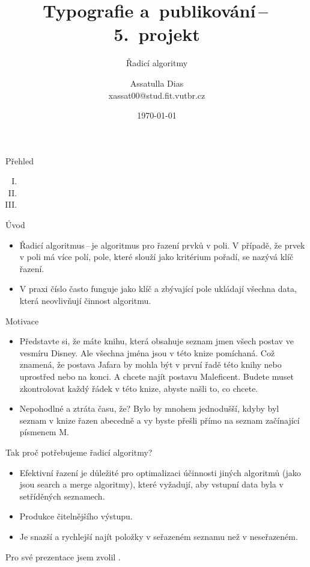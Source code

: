 \documentclass[11pt]{beamer}
\title{Typografie a~publikování\,--\,5.~projekt}
\subtitle{Řadicí algoritmy}
\author{Assatulla Dias \\\smallskip \tiny{xassat00@stud.fit.vutbr.cz}}
\date{\today}
\begin{document}
\maketitle
{}
\begin{frame}{Přehled}
 \begin{enumerate}[(I)]
     \item {}
     \pause
     \item {}
     \pause
     \item {}
 \end{enumerate}
\end{frame}

\begin{frame}{Úvod}
    \begin{itemize}
        \item Řadicí algoritmus\,--\,je algoritmus pro řazení prvků v poli. V případě, že prvek v poli má více polí, pole, které slouží jako kritérium pořadí, se nazývá klíč řazení. 
        \item V praxi číslo často funguje jako klíč a zbývající pole ukládají všechna data, která neovlivňují činnost algoritmu.
    \end{itemize}
\end{frame}

\begin{frame}{Motivace}
    \begin{itemize}
        \item Představte si, že máte knihu, která obsahuje seznam jmen všech postav ve vesmíru Disney. Ale všechna jména jsou v této knize pomíchaná. Což znamená, že postava Jafara by mohla být v první řadě této knihy nebo uprostřed nebo na konci. A chcete najít postavu Maleficent. Budete muset zkontrolovat každý řádek v této knize, abyste našli to, co chcete. 
        \item Nepohodlné a ztráta času, že? Bylo by mnohem jednodušší, kdyby byl seznam v knize řazen abecedně a vy byste přešli přímo na seznam začínající písmenem M.
    \end{itemize}
\end{frame}

\begin{frame}{Tak proč potřebujeme řadicí algoritmy?}
    \begin{itemize}
        \item Efektivní řazení je důležité pro optimalizaci účinnosti jiných algoritmů (jako jsou search a merge algoritmy), které vyžadují, aby vstupní data byla v setříděných seznamech.
        \item Produkce čitelnějšího výstupu.
        \item Je snazší a rychlejší najít položky v seřazeném seznamu než v neseřazeném.
    \end{itemize}
    \bigskip
    Pro své prezentace jsem zvolil .
\end{frame}
\end{document}
